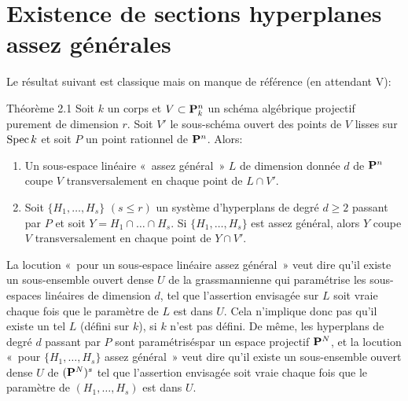 \documentclass[10pt]{../fichiers-configuration-latex/smfart}
\begin{document}
\section{Existence de sections hyperplanes assez générales}

Le résultat suivant est classique mais on manque de référence (en
attendant \EGA V):

\begin{enonce*}{Théorème 2.1} %
Soit $k$ un corps et $V\subset \mathbf{P}^n_k$ un schéma algébrique
projectif purement de dimension $r$. Soit $V'$ le sous-schéma ouvert
des points de $V$ lisses sur $\operatorname{Spec} k$ et soit $P$ un point rationnel
de $\mathbf{P}^n$. Alors:
\begin{enumerate}
\renewcommand{\theenumi}{\roman{enumi}}
\renewcommand{\labelenumi}{(\theenumi)}
\item Un sous-espace linéaire « assez général » $L$ de dimension
  donnée $d$ de $\mathbf{P}^n$ coupe $V$ transversalement en chaque
  point de $L\cap V'$.

\item Soit $\{H_1,\ldots,H_s\}$ $(s\leq r)$ un système d'hyperplans de %
  degré $d\geq 2$ passant par $P$ et soit $Y=H_1\cap\ldots \cap
  H_s$. Si $\{H_1,\ldots,H_s\}$ est assez général, alors $Y$ coupe $V$
  transversalement en chaque point de $Y\cap V'$.
\end{enumerate}
\end{enonce*}

La locution « pour un sous-espace linéaire assez général » veut
dire qu'il existe un sous-ensemble ouvert dense $U$ de la
grassmannienne qui paramétrise les sous-espaces linéaires de dimension %
$d$, tel que l'assertion envisagée sur $L$ soit vraie chaque fois que
le paramètre de $L$ est dans $U$. Cela n'implique donc pas qu'il
existe un tel $L$ (défini sur $k$), si $k$ n'est pas défini. De même,
les hyperplans de degré $d$ passant par $P$ sont 
paramétrisés\pageoriginale par un espace projectif $\mathbf{P}^N$, et la %
locution « pour $\{H_1,\ldots,H_s\}$ assez général » veut dire
qu'il existe un sous-ensemble ouvert dense $U$ de $(\mathbf{P}^N)^s$
tel que l'assertion envisagée soit vraie chaque fois que le paramètre
de $(H_1,\ldots,H_s)$ est dans $U$.
\end{document}
